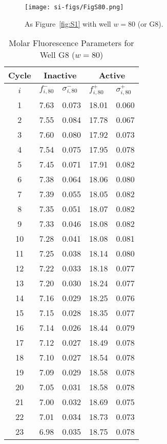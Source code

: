                 \begin{figure}
                    \centering
                    \texttt{[image: si-figs/FigS80.png]}
                    \caption{
                        As Figure~\ref{fig:S1} with well $w=80$ (or G8).
                    }
                \end{figure}
                \clearpage
    \begin{table}
        \caption{Molar Fluorescence Parameters for Well G8 ($w=80$)}
        \centering
        \begin{tabular}{c|ll|ll}
            Cycle & \multicolumn{2}{c|}{Inactive} & \multicolumn{2}{c}{Active} \\
            \hline
            $i$ & $f_{i,80}^{-}$ & $\sigma_{i,80}^{-}$ &  $f_{i,80}^{+}$ & $\sigma_{i,80}^{+}$ \\
            \hline
    1 & 7.63 & 0.073 & 18.01 & 0.060 \\
2 & 7.55 & 0.084 & 17.78 & 0.067 \\
3 & 7.60 & 0.080 & 17.92 & 0.073 \\
4 & 7.54 & 0.075 & 17.95 & 0.078 \\
5 & 7.45 & 0.071 & 17.91 & 0.082 \\
6 & 7.38 & 0.064 & 18.06 & 0.080 \\
7 & 7.39 & 0.055 & 18.05 & 0.082 \\
8 & 7.35 & 0.051 & 18.07 & 0.082 \\
9 & 7.33 & 0.046 & 18.08 & 0.082 \\
10 & 7.28 & 0.041 & 18.08 & 0.081 \\
11 & 7.25 & 0.038 & 18.14 & 0.080 \\
12 & 7.22 & 0.033 & 18.18 & 0.077 \\
13 & 7.20 & 0.030 & 18.24 & 0.077 \\
14 & 7.16 & 0.029 & 18.25 & 0.076 \\
15 & 7.15 & 0.028 & 18.35 & 0.077 \\
16 & 7.14 & 0.026 & 18.44 & 0.079 \\
17 & 7.12 & 0.027 & 18.49 & 0.078 \\
18 & 7.10 & 0.027 & 18.54 & 0.078 \\
19 & 7.09 & 0.029 & 18.58 & 0.078 \\
20 & 7.05 & 0.031 & 18.58 & 0.078 \\
21 & 7.00 & 0.032 & 18.69 & 0.075 \\
22 & 7.01 & 0.034 & 18.73 & 0.073 \\
23 & 6.98 & 0.035 & 18.75 & 0.078 \\

\end{tabular}
\end{table}
